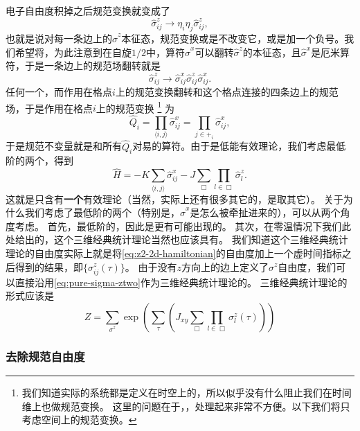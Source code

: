 \documentclass[hyperref, UTF8, a4paper]{ctexart}
\newcommand*{\pair}[1]{\langle #1 \rangle}
\renewcommand{\emph}[1]{\textbf{#1}}
\newcommand*{\Ztwo}{$\mathbb{Z}_2$}
\begin{document}
电子自由度积掉之后规范变换就变成了
\begin{equation}
    \hat{\sigma}_{ij}^z \longrightarrow \eta_i \eta_j \hat{\sigma}_{ij}^z,
    \label{eq:pure-sigma-ztwo}
\end{equation}
也就是说对每一条边上的$\hat{\sigma}^z$本征态，规范变换或是不改变它，或是加一个负号。我们希望将，为此注意到在自旋$1/2$中，算符$\hat{\sigma}^x$可以翻转$\hat{\sigma}^z$的本征态，且$\hat{\sigma}^x$是厄米算符，于是一条边上的规范场翻转就是
\[
    \hat{\sigma}_{ij}^z \longrightarrow \hat{\sigma}^x_{ij} \hat{\sigma}_{ij}^z \hat{\sigma}^x_{ij}.
\]
任何一个，而作用在格点$i$上的规范变换翻转和这个格点连接的四条边上的规范场，于是作用在格点$i$上的规范变换
\footnote{
    我们知道实际的系统都是定义在时空上的，所以似乎没有什么阻止我们在时间维上也做规范变换。
    这里的问题在于，，处理起来非常不方便。以下我们将只考虑空间上的规范变换。
}%
为
\begin{equation}
    \hat{Q}_i = \prod_{\pair{i, j}} \hat{\sigma}^x_{ij} = \prod_{j \in +_i} \hat{\sigma}^x_{ij},
    \label{eq:z2-charge}
\end{equation}
于是规范不变量就是和所有$\hat{Q}_i$对易的算符。由于是低能有效理论，我们考虑最低阶的两个，得到
\begin{equation}
    \hat{H} = - K \sum_{\pair{i, j}} \hat{\sigma}^x_{ij} - J \sum_{\Box} \prod_{l \in \Box} \hat{\sigma}^z_{l}.
    \label{eq:z2-2d-hamiltonian}
\end{equation}
这就是只含有\emph{一个}有效理论（当然，实际上还有很多其它的，是取其它）。
关于为什么我们考虑了最低阶的两个（特别是，$\hat{\sigma}^x$是怎么被牵扯进来的），可以从两个角度考虑。
首先，最低阶的，因此是更有可能出现的。
其次，在零温情况下我们此处给出的，这个三维经典统计理论当然也应该具有。
我们知道这个三维经典统计理论的自由度实际上就是将\eqref{eq:z2-2d-hamiltonian}的自由度加上一个虚时间指标之后得到的结果，即$\{\sigma^z_{ij}(\tau)\}$。
由于没有$z$方向上的边上定义了$\sigma^z$自由度，我们可以直接沿用\eqref{eq:pure-sigma-ztwo}作为三维经典统计理论的。
三维经典统计理论的形式应该是
\[
    Z = \sum_{\sigma^z} \exp(\sum_{\tau} (J_{xy} \sum_{\Box} \prod_{l \in \Box} \sigma_l^z(\tau)  ) )
\]

\subsubsection{去除规范自由度}
\end{document}
